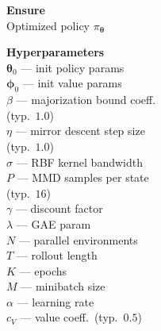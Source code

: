 \documentclass[11pt]{article}
\begin{document}
\begin{algorithm}[p]\small
\caption{MM-RKHS --- Practical Vectorized Implementation}\label{alg:mmrkhs-practical}
\vspace{2pt}
\noindent
\begin{minipage}[t]{0.28\linewidth}
\renewcommand{\arraystretch}{1.12}
\textbf{Ensure} \\[2pt]
Optimized policy $\pi_{\boldsymbol{\theta}}$

\vspace{6pt}
\textbf{Hyperparameters} \\[2pt]
$\boldsymbol{\theta}_0$ --- init policy params \\
$\boldsymbol{\phi}_0$ --- init value params \\
$\beta$ --- majorization bound coeff. \\
\hspace*{1em}(typ.\ $1.0$) \\
$\eta$ --- mirror descent step size \\
\hspace*{1em}(typ.\ $1.0$) \\
$\sigma$ --- RBF kernel bandwidth \\
$P$ --- MMD samples per state \\
\hspace*{1em}(typ.\ $16$) \\
$\gamma$ --- discount factor \\
$\lambda$ --- GAE param \\
$N$ --- parallel environments \\
$T$ --- rollout length \\
$K$ --- epochs \\
$M$ --- minibatch size \\
$\alpha$ --- learning rate \\
$c_V$ --- value coeff.\ (typ.\ $0.5$)


\end{minipage}
\end{algorithm}
\end{document}
